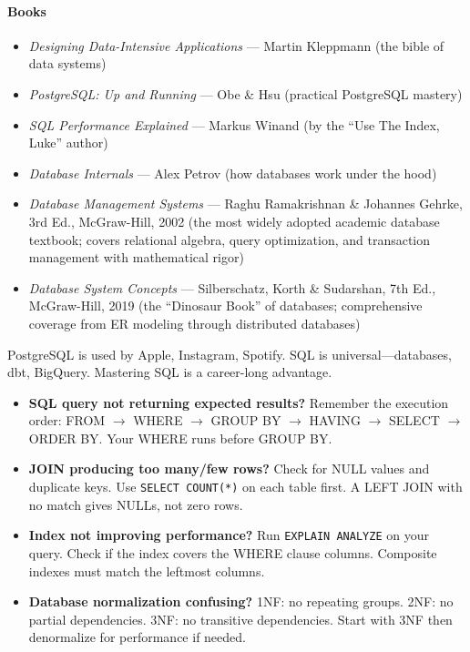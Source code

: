 \documentclass[11pt, a4paper, oneside]{report}
\begin{document}
\paragraph{Books}
\begin{itemize}[leftmargin=*]
\item \emph{Designing Data-Intensive Applications} --- Martin Kleppmann (the bible of data systems)
\item \emph{PostgreSQL: Up and Running} --- Obe \& Hsu (practical PostgreSQL mastery)
\item \emph{SQL Performance Explained} --- Markus Winand (by the ``Use The Index, Luke'' author)
\item \emph{Database Internals} --- Alex Petrov (how databases work under the hood)

\item \emph{Database Management Systems} --- Raghu Ramakrishnan \& Johannes Gehrke, 3rd Ed., McGraw-Hill, 2002 (the most widely adopted academic database textbook; covers relational algebra, query optimization, and transaction management with mathematical rigor)
\item \emph{Database System Concepts} --- Silberschatz, Korth \& Sudarshan, 7th Ed., McGraw-Hill, 2019 (the ``Dinosaur Book'' of databases; comprehensive coverage from ER modeling through distributed databases)
\end{itemize}


\begin{realworldbox}
PostgreSQL is used by Apple, Instagram, Spotify. SQL is universal---databases, dbt, BigQuery. Mastering SQL is a career-long advantage.
\end{realworldbox}


\begin{stuckbox}
\begin{itemize}[leftmargin=*]
\item \textbf{SQL query not returning expected results?} Remember the execution order: FROM \(\to\) WHERE \(\to\) GROUP BY \(\to\) HAVING \(\to\) SELECT \(\to\) ORDER BY. Your WHERE runs before GROUP BY.
\item \textbf{JOIN producing too many/few rows?} Check for NULL values and duplicate keys. Use \texttt{SELECT COUNT(*)} on each table first. A LEFT JOIN with no match gives NULLs, not zero rows.
\item \textbf{Index not improving performance?} Run \texttt{EXPLAIN ANALYZE} on your query. Check if the index covers the WHERE clause columns. Composite indexes must match the leftmost columns.
\item \textbf{Database normalization confusing?} 1NF: no repeating groups. 2NF: no partial dependencies. 3NF: no transitive dependencies. Start with 3NF then denormalize for performance if needed.
\end{itemize}
\end{stuckbox}
\end{document}
